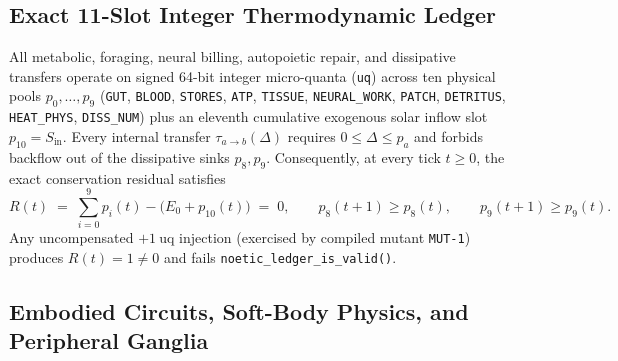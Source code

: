 \documentclass[11pt,reqno]{amsart}
\theoremstyle{remark}
\begin{document}
\subsection{Exact 11-Slot Integer Thermodynamic Ledger}
\label{subsec:ledger}

All metabolic, foraging, neural billing, autopoietic repair, and dissipative transfers operate on signed 64-bit integer micro-quanta (\texttt{uq}) across ten physical pools $p_0,\dots,p_9$ (\texttt{GUT}, \texttt{BLOOD}, \texttt{STORES}, \texttt{ATP}, \texttt{TISSUE}, \texttt{NEURAL\_WORK}, \texttt{PATCH}, \texttt{DETRITUS}, \texttt{HEAT\_PHYS}, \texttt{DISS\_NUM}) plus an eleventh cumulative exogenous solar inflow slot $p_{10} = S_{\text{in}}$. Every internal transfer $\tau_{a \to b}(\Delta)$ requires $0 \le \Delta \le p_a$ and forbids backflow out of the dissipative sinks $p_8, p_9$. Consequently, at every tick $t \ge 0$, the exact conservation residual satisfies
\begin{equation}
\label{eq:firstlaw}
R(t) \;=\; \sum_{i=0}^{9} p_i(t) - \bigl(E_0 + p_{10}(t)\bigr) \;=\; 0,
\qquad p_8(t+1) \ge p_8(t), \qquad p_9(t+1) \ge p_9(t).
\end{equation}
Any uncompensated $+1~\text{uq}$ injection (exercised by compiled mutant \texttt{MUT-1}) produces $R(t) = 1 \ne 0$ and fails \texttt{noetic\_ledger\_is\_valid()}.

\subsection{Embodied Circuits, Soft-Body Physics, and Peripheral Ganglia}
\label{subsec:circuits}
\end{document}
